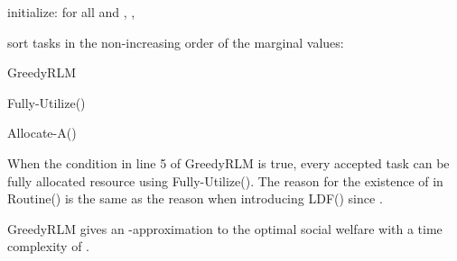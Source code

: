 \documentclass[10pt,journal,compsoc]{IEEEtran}
\begin{document}
\begin{algorithm}[!ht]





\BlankLine





initialize:  for all  and , , \;

sort tasks in the non-increasing order of the marginal values: \;

\;




\caption{GreedyRLM\label{GreedyRLM}}
\end{algorithm}





\begin{algorithm}[!ht]


Fully-Utilize()\;


\caption{Allocate-A()\label{Allocate-A}}
\end{algorithm}




When the condition in line 5 of GreedyRLM is true, every accepted task can be fully allocated  resource using Fully-Utilize(). The reason for the existence of  in Routine() is the same as the reason when introducing LDF() since .




\begin{proposition}\label{proposition-GreedyRLM}
GreedyRLM gives an -approximation to the optimal social welfare with a time complexity of .
\end{proposition}
\end{document}
